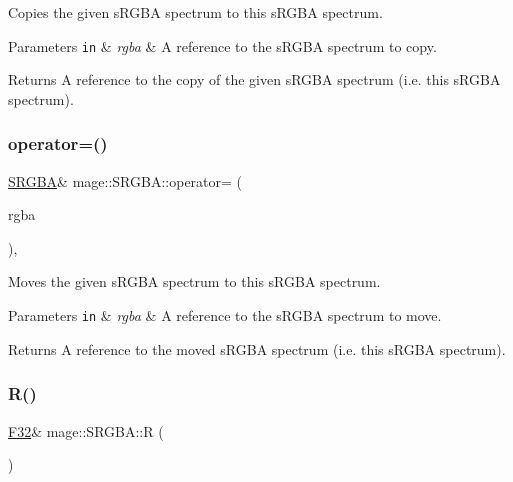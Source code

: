Copies the given s\+R\+G\+BA spectrum to this s\+R\+G\+BA spectrum.


\begin{DoxyParams}[1]{Parameters}
\mbox{\tt in}  & {\em rgba} & A reference to the s\+R\+G\+BA spectrum to copy. \\
\hline
\end{DoxyParams}
\begin{DoxyReturn}{Returns}
A reference to the copy of the given s\+R\+G\+BA spectrum (i.\+e. this s\+R\+G\+BA spectrum). 
\end{DoxyReturn}
\mbox{\label{structmage_1_1_s_r_g_b_a_a0f7080a5fc080f5e3463ca95bb21918c}} 
\subsubsection{\texorpdfstring{operator=()}{operator=()}\hspace{0.1cm}{\footnotesize\ttfamily [2/2]}}
{\footnotesize\ttfamily \mbox{\hyperlink{structmage_1_1_s_r_g_b_a}{S\+R\+G\+BA}}\& mage\+::\+S\+R\+G\+B\+A\+::operator= (\begin{DoxyParamCaption}\item[{\mbox{\hyperlink{structmage_1_1_s_r_g_b_a}{S\+R\+G\+BA}} \&\&}]{rgba }\end{DoxyParamCaption})\hspace{0.3cm}{\ttfamily [default]}, {\ttfamily [noexcept]}}

Moves the given s\+R\+G\+BA spectrum to this s\+R\+G\+BA spectrum.


\begin{DoxyParams}[1]{Parameters}
\mbox{\tt in}  & {\em rgba} & A reference to the s\+R\+G\+BA spectrum to move. \\
\hline
\end{DoxyParams}
\begin{DoxyReturn}{Returns}
A reference to the moved s\+R\+G\+BA spectrum (i.\+e. this s\+R\+G\+BA spectrum). 
\end{DoxyReturn}
\mbox{\label{structmage_1_1_s_r_g_b_a_a45310787ec16705f026cdcee58e1f783}} 
\subsubsection{\texorpdfstring{R()}{R()}\hspace{0.1cm}{\footnotesize\ttfamily [1/2]}}
{\footnotesize\ttfamily \mbox{\hyperlink{namespacemage_aa97e833b45f06d60a0a9c4fc22ae02c0}{F32}}\& mage\+::\+S\+R\+G\+B\+A\+::R (\begin{DoxyParamCaption}{ }\end{DoxyParamCaption})\hspace{0.3cm}{\ttfamily [noexcept]}}

